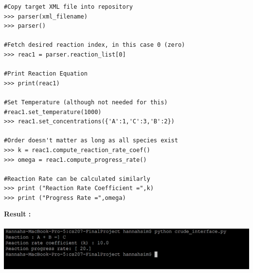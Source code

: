 \begin{mdframed}[backgroundcolor=light-gray, roundcorner=10pt,leftmargin=1, rightmargin=5, innerleftmargin=10, innertopmargin=5,innerbottommargin=5, outerlinewidth=1, linecolor=light-gray]
\begin{lstlisting}
#Copy target XML file into repository
>>> parser(xml_filename)
>>> parser()

#Fetch desired reaction index, in this case 0 (zero)
>>> reac1 = parser.reaction_list[0]

#Print Reaction Equation
>>> print(reac1)

#Set Temperature (although not needed for this)
#reac1.set_temperature(1000)
>>> reac1.set_concentrations({'A':1,'C':3,'B':2})

#Order doesn't matter as long as all species exist
>>> k = reac1.compute_reaction_rate_coef()
>>> omega = reac1.compute_progress_rate()

#Reaction Rate can be calculated similarly
>>> print ("Reaction Rate Coefficient =",k)
>>> print ("Progress Rate =",omega)
\end{lstlisting}
\end{mdframed} 
\textbf{Result :}\\
\\
\includegraphics[scale=0.35]{result}